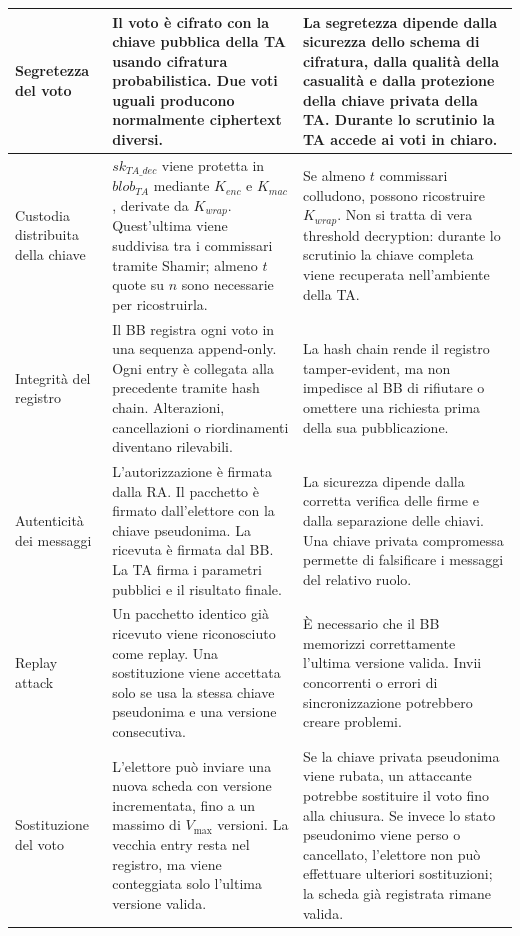 \documentclass[12pt,a4paper]{article}
\newcommand{\sk}{\mathit{sk}}
\begin{document}
\begin{small}
\begin{longtable}{>{\raggedright}p{2.5cm} p{5.5cm} p{5cm}}
Segretezza del voto &
Il voto \`e cifrato con la chiave pubblica della TA usando cifratura probabilistica. Due voti uguali producono normalmente ciphertext diversi. &
La segretezza dipende dalla sicurezza dello schema di cifratura, dalla qualit\`a della casualit\`a e dalla protezione della chiave privata della TA. Durante lo scrutinio la TA accede ai voti in chiaro. \\
\midrule

Custodia distribuita della chiave &
$\sk_{\mathit{TA\_dec}}$ viene protetta in
$\mathit{blob}_{\mathit{TA}}$ mediante
$K_{\mathit{enc}}$ e $K_{\mathit{mac}}$, derivate da
$K_{\mathit{wrap}}$. Quest'ultima viene suddivisa tra i commissari
tramite Shamir; almeno $t$ quote su $n$ sono necessarie per ricostruirla. &
Se almeno $t$ commissari colludono, possono ricostruire $K_{\mathit{wrap}}$. Non si tratta di vera threshold decryption: durante lo scrutinio la chiave completa viene recuperata nell'ambiente della TA. \\
\midrule

Integrit\`a del registro &
Il BB registra ogni voto in una sequenza append-only. Ogni entry \`e collegata alla precedente tramite hash chain. Alterazioni, cancellazioni o riordinamenti diventano rilevabili. &
La hash chain rende il registro tamper-evident, ma non impedisce al BB di rifiutare o omettere una richiesta prima della sua pubblicazione. \\
\midrule

Autenticit\`a dei messaggi &
L'autorizzazione \`e firmata dalla RA. Il pacchetto \`e firmato dall'elettore con la chiave pseudonima. La ricevuta \`e firmata dal BB. La TA firma i parametri pubblici e il risultato finale. &
La sicurezza dipende dalla corretta verifica delle firme e dalla separazione delle chiavi. Una chiave privata compromessa permette di falsificare i messaggi del relativo ruolo. \\
\midrule

Replay attack &
Un pacchetto identico gi\`a ricevuto viene riconosciuto come replay. Una sostituzione viene accettata solo se usa la stessa chiave pseudonima e una versione consecutiva. &
\`E necessario che il BB memorizzi correttamente l'ultima versione valida. Invii concorrenti o errori di sincronizzazione potrebbero creare problemi. \\
\midrule

Sostituzione del voto &
L'elettore pu\`o inviare una nuova scheda con versione incrementata, fino a un massimo di $V_{\max}$ versioni. La vecchia entry resta nel registro, ma viene conteggiata solo l'ultima versione valida. &
Se la chiave privata pseudonima viene rubata, un attaccante potrebbe sostituire il voto fino alla chiusura. Se invece lo stato pseudonimo viene perso o cancellato, l'elettore non può effettuare ulteriori sostituzioni; la scheda già registrata rimane valida. \\
\midrule


\end{longtable}
\end{small}
\end{document}
